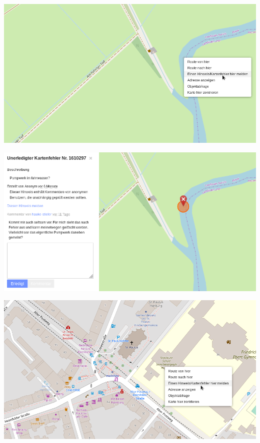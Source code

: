 \documentclass{beamer}
\begin{document}
	\begin{frame}
		\begin{center}
			\includegraphics[width=\linewidth,height=\textheight,keepaspectratio]{images/report-error-menu}
		\end{center}
	\end{frame}
	
	\begin{frame}
		\begin{center}
			\includegraphics[width=\linewidth,height=\textheight,keepaspectratio]{images/report-error}
		\end{center}
	\end{frame}

	\begin{frame}
		\begin{center}
			\includegraphics[width=\linewidth,height=\textheight,keepaspectratio]{images/report-error-2-menu}
		\end{center}
	\end{frame}
	
\end{document}
